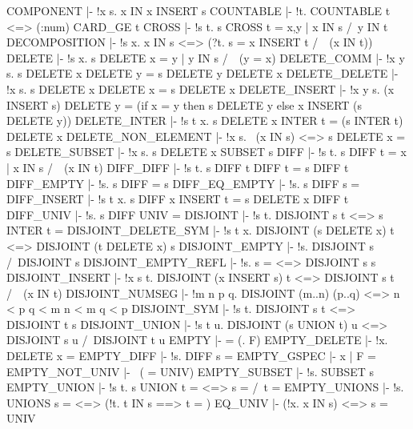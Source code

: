 \ENDTHEOREM
\THEOREM COMPONENT
  |- !x s. x IN x INSERT s
\ENDTHEOREM
\THEOREM COUNTABLE
  |- !t. COUNTABLE t <=> (:num) CARD_GE t
\ENDTHEOREM
\THEOREM CROSS
  |- !s t. s CROSS t = {x,y | x IN s /\ y IN t}
\ENDTHEOREM
\THEOREM DECOMPOSITION
  |- !s x. x IN s <=> (?t. s = x INSERT t /\ ~(x IN t))
\ENDTHEOREM
\THEOREM DELETE
  |- !s x. s DELETE x = {y | y IN s /\ ~(y = x)}
\ENDTHEOREM
\THEOREM DELETE\_COMM
  |- !x y s. s DELETE x DELETE y = s DELETE y DELETE x
\ENDTHEOREM
\THEOREM DELETE\_DELETE
  |- !x s. s DELETE x DELETE x = s DELETE x
\ENDTHEOREM
\THEOREM DELETE\_INSERT
  |- !x y s.
         (x INSERT s) DELETE y =
         (if x = y then s DELETE y else x INSERT (s DELETE y))
\ENDTHEOREM
\THEOREM DELETE\_INTER
  |- !s t x. s DELETE x INTER t = (s INTER t) DELETE x
\ENDTHEOREM
\THEOREM DELETE\_NON\_ELEMENT
  |- !x s. ~(x IN s) <=> s DELETE x = s
\ENDTHEOREM
\THEOREM DELETE\_SUBSET
  |- !x s. s DELETE x SUBSET s
\ENDTHEOREM
\THEOREM DIFF
  |- !s t. s DIFF t = {x | x IN s /\ ~(x IN t)}
\ENDTHEOREM
\THEOREM DIFF\_DIFF
  |- !s t. s DIFF t DIFF t = s DIFF t
\ENDTHEOREM
\THEOREM DIFF\_EMPTY
  |- !s. s DIFF {} = s
\ENDTHEOREM
\THEOREM DIFF\_EQ\_EMPTY
  |- !s. s DIFF s = {}
\ENDTHEOREM
\THEOREM DIFF\_INSERT
  |- !s t x. s DIFF x INSERT t = s DELETE x DIFF t
\ENDTHEOREM
\THEOREM DIFF\_UNIV
  |- !s. s DIFF UNIV = {}
\ENDTHEOREM
\THEOREM DISJOINT
  |- !s t. DISJOINT s t <=> s INTER t = {}
\ENDTHEOREM
\THEOREM DISJOINT\_DELETE\_SYM
  |- !s t x. DISJOINT (s DELETE x) t <=> DISJOINT (t DELETE x) s
\ENDTHEOREM
\THEOREM DISJOINT\_EMPTY
  |- !s. DISJOINT {} s /\ DISJOINT s {}
\ENDTHEOREM
\THEOREM DISJOINT\_EMPTY\_REFL
  |- !s. s = {} <=> DISJOINT s s
\ENDTHEOREM
\THEOREM DISJOINT\_INSERT
  |- !x s t. DISJOINT (x INSERT s) t <=> DISJOINT s t /\ ~(x IN t)
\ENDTHEOREM
\THEOREM DISJOINT\_NUMSEG
  |- !m n p q. DISJOINT (m..n) (p..q) <=> n < p \/ q < m \/ n < m \/ q < p
\ENDTHEOREM
\THEOREM DISJOINT\_SYM
  |- !s t. DISJOINT s t <=> DISJOINT t s
\ENDTHEOREM
\THEOREM DISJOINT\_UNION
  |- !s t u. DISJOINT (s UNION t) u <=> DISJOINT s u /\ DISJOINT t u
\ENDTHEOREM
\THEOREM EMPTY
  |- {} = (\x. F)
\ENDTHEOREM
\THEOREM EMPTY\_DELETE
  |- !x. {} DELETE x = {}
\ENDTHEOREM
\THEOREM EMPTY\_DIFF
  |- !s. {} DIFF s = {}
\ENDTHEOREM
\THEOREM EMPTY\_GSPEC
  |- {x | F} = {}
\ENDTHEOREM
\THEOREM EMPTY\_NOT\_UNIV
  |- ~({} = UNIV)
\ENDTHEOREM
\THEOREM EMPTY\_SUBSET
  |- !s. {} SUBSET s
\ENDTHEOREM
\THEOREM EMPTY\_UNION
  |- !s t. s UNION t = {} <=> s = {} /\ t = {}
\ENDTHEOREM
\THEOREM EMPTY\_UNIONS
  |- !s. UNIONS s = {} <=> (!t. t IN s ==> t = {})
\ENDTHEOREM
\THEOREM EQ\_UNIV
  |- (!x. x IN s) <=> s = UNIV
